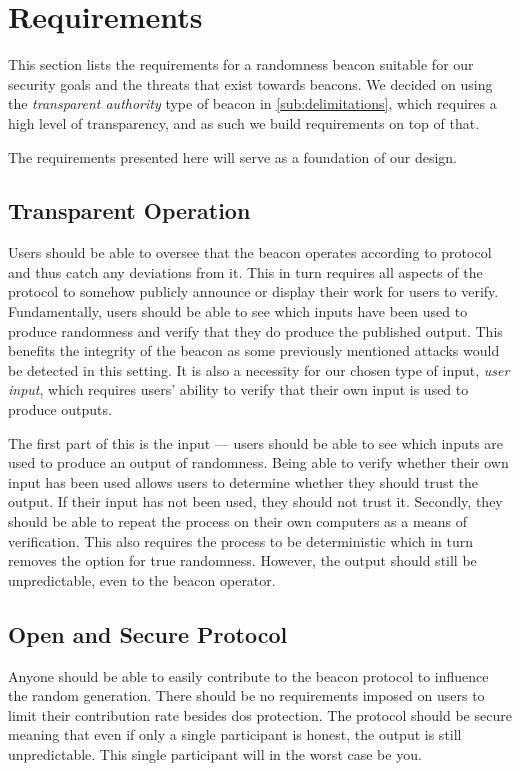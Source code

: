 \section{Requirements}%
\label{sec:beacon_requirements}
This section lists the requirements for a randomness beacon suitable for our security goals and the threats that exist towards beacons.
We decided on using the \emph{transparent authority} type of beacon in \cref{sub:delimitations}, which requires a high level of transparency, and as such we build requirements on top of that.

The requirements presented here will serve as a foundation of our design.

\subsection{Transparent Operation}
Users should be able to oversee that the beacon operates according to protocol and thus catch any deviations from it.
This in turn requires all aspects of the protocol to somehow publicly announce or display their work for users to verify.
Fundamentally, users should be able to see which inputs have been used to produce randomness and verify that they do produce the published output.
This benefits the integrity of the beacon as some previously mentioned attacks would be detected in this setting.
It is also a necessity for our chosen type of input, \emph{user input}, which requires users' ability to verify that their own input is used to produce outputs.

The first part of this is the input --- users should be able to see which inputs are used to produce an output of randomness.
Being able to verify whether their own input has been used allows users to determine whether they should trust the output.
If their input has not been used, they should not trust it.
Secondly, they should be able to repeat the process on their own computers as a means of verification.
This also requires the process to be deterministic which in turn removes the option for true randomness.
However, the output should still be unpredictable, even to the beacon operator.

\subsection{Open and Secure Protocol}
Anyone should be able to easily contribute to the beacon protocol to influence the random generation. There should be no requirements imposed on users to limit their contribution rate besides \gls{dos} protection. The protocol should be secure meaning that even if only a single participant is honest, the output is still unpredictable. This single participant will in the worst case be you.

